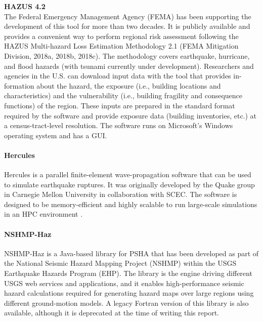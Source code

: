 \noindent\textbf{HAZUS 4.2} \\The Federal Emergency Management Agency (FEMA) has been supporting the development of this tool for more than two decades. It is publicly available and provides a convenient way to perform regional risk assessment following the HAZUS Multi-hazard Loss Estimation Methodology 2.1 (FEMA Mitigation Division, 2018a, 2018b, 2018c). The methodology covers earthquake, hurricane, and flood hazards (with tsunami currently under development). Researchers and agencies in the U.S. can download input data with the tool that provides in-formation about the hazard, the exposure (i.e., building locations and characteristics) and the vulnerability (i.e., building fragility and consequence functions) of the region. These inputs are prepared in the standard format required by the software and provide exposure data (building inventories, etc.) at a census-tract-level resolution. The software runs on Microsoft’s Windows operating system and has a GUI.

\paragraph{Hercules} Hercules \citep{tu2006mesh} is a parallel finite-element wave-propagation software that can be used to simulate earthquake ruptures. It was originally developed by the Quake group in Carnegie Mellon University in collaboration with SCEC. The software is designed to be memory-efficient and highly scalable to run large-scale simulations in an HPC environment \citep{taborda2010speeding}. 

\paragraph{NSHMP-Haz} NSHMP-Haz is a Java-based library for PSHA that has been developed as part of the National Seismic Hazard Mapping Project (NSHMP) within the USGS Earthquake Hazards Program (EHP). The library is the engine driving different USGS web services and applications, and it enables high-performance seismic hazard calculations required for generating hazard maps over large regions using different ground-motion models. A legacy Fortran version of this library is also available, although it is deprecated at the time of writing this report.


